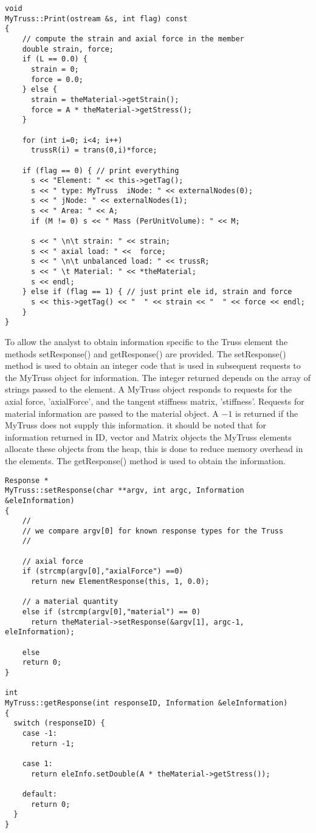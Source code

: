 \documentclass[12pt]{article}
\begin{document}
{\sf\small
\begin{verbatim}
void
MyTruss::Print(ostream &s, int flag) const
{
    // compute the strain and axial force in the member
    double strain, force;
    if (L == 0.0) {
      strain = 0;
      force = 0.0;
    } else {
      strain = theMaterial->getStrain();
      force = A * theMaterial->getStress();    
    }

    for (int i=0; i<4; i++)
      trussR(i) = trans(0,i)*force;

    if (flag == 0) { // print everything
      s << "Element: " << this->getTag(); 
      s << " type: MyTruss  iNode: " << externalNodes(0);
      s << " jNode: " << externalNodes(1);
      s << " Area: " << A;
      if (M != 0) s << " Mass (PerUnitVolume): " << M;	
	
      s << " \n\t strain: " << strain;
      s << " axial load: " <<  force;
      s << " \n\t unbalanced load: " << trussR;
      s << " \t Material: " << *theMaterial;
      s << endl;
    } else if (flag == 1) { // just print ele id, strain and force
      s << this->getTag() << "  " << strain << "  " << force << endl;
    }
}
\end{verbatim} }


To allow the analyst to obtain information specific to the Truss
element the methods {\sf setResponse()} and {\sf getResponse()} are
provided. The {\sf setResponse()} method is used to obtain an integer
code that is used in subsequent requests to the MyTruss object for
information. The integer returned depends on the array of strings
passed to the element. A MyTruss object responds to requests for
the axial force, 'axialForce', and the tangent stiffness matrix,
'stiffness'. Requests for material information are passed to the
material object. A $-1$ is returned if the MyTruss does not supply
this information. it should be noted that for information returned in
ID, vector and Matrix objects the MyTruss elements allocate these
objects from the heap, this is done to reduce memory overhead in the
elements. The {\sf getResponse()} method is used to obtain the
information. 

{\sf\small
\begin{verbatim}
Response *
MyTruss::setResponse(char **argv, int argc, Information &eleInformation)
{
    //
    // we compare argv[0] for known response types for the Truss
    //

    // axial force
    if (strcmp(argv[0],"axialForce") ==0) 
      return new ElementResponse(this, 1, 0.0);

    // a material quantity    
    else if (strcmp(argv[0],"material") == 0)
      return theMaterial->setResponse(&argv[1], argc-1, eleInformation);

    else
	return 0;
}

int 
MyTruss::getResponse(int responseID, Information &eleInformation)
{
  switch (responseID) {
    case -1:
      return -1;
      
    case 1:
      return eleInfo.setDouble(A * theMaterial->getStress());

    default:
      return 0;
  }
}
\end{verbatim} }
\end{document}
